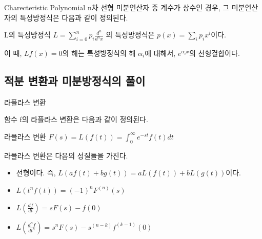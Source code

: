 \documentclass{beamer}
\begin{document}





\begin{frame}{Charecteristic Polynomial} 
n차 선형 미분연산자 중 계수가 상수인 경우, 그 미분연산자의 특성방정식은 다음과 같이 정의된다. 
\begin{block}{L의 특성방정식}
$L = \sum_{i=0}^n p_i \frac{d^n}{d^nx} $ 의 특성방정식은 $p(x) = \sum_i p_ix^i$이다.
\end{block}
이 때, $Lf(x) = 0$의 해는 특성방정식의 해 $\alpha_i$에 대해서, $e^{\alpha_i x}$의 선형결합이다. 
\end{frame}

\subsection{적분 변환과 미분방정식의 풀이} 


\begin{frame}[allowframebreaks]{라플라스 변환} 

함수 f의 라플라스 변환은 다음과 같이 정의된다. 
\begin{block}{라플라스 변환} 
$F(s) = L(f(t)) = \int_0^{\infty} e^{-st} f(t) dt $
\end{block}

라플라스 변환은 다음의 성질들을 가진다. 

\begin{itemize} 
\item 선형이다. 즉, $L(af(t) + bg(t)) = aL(f(t)) + bL(g(t))$이다. 
\item $L(t^nf(t)) = (-1)^nF^(n)(s)$ 
\item $L(\frac{df}{dt}) = sF(s) - f(0)$
\item $L(\frac{d^nf}{dt^n}) = s^nF(s) - s^(n-k)f^{(k-1)}(0)$
\end{itemize}

\end{frame}
\end{document}
